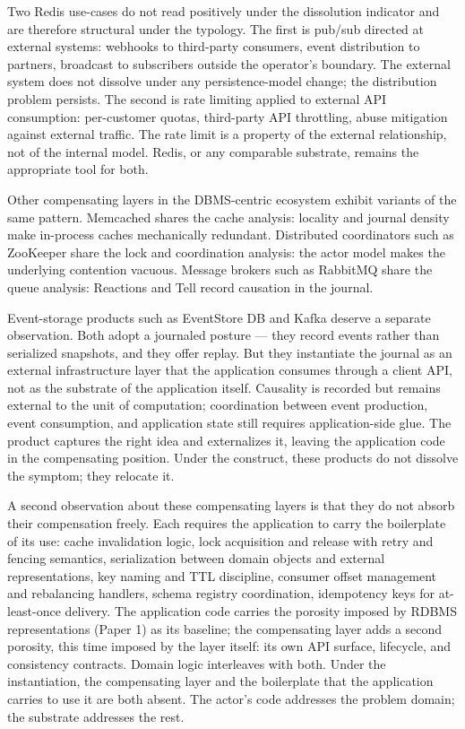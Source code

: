 \documentclass[
]{article}
\begin{document}
Two Redis use-cases do not read positively under the dissolution
indicator and are therefore structural under the typology. The first is
pub/sub directed at external systems: webhooks to third-party consumers,
event distribution to partners, broadcast to subscribers outside the
operator's boundary. The external system does not dissolve under any
persistence-model change; the distribution problem persists. The second
is rate limiting applied to external API consumption: per-customer
quotas, third-party API throttling, abuse mitigation against external
traffic. The rate limit is a property of the external relationship, not
of the internal model. Redis, or any comparable substrate, remains the
appropriate tool for both.

Other compensating layers in the DBMS-centric ecosystem exhibit variants
of the same pattern. Memcached shares the cache analysis: locality and
journal density make in-process caches mechanically redundant.
Distributed coordinators such as ZooKeeper share the lock and
coordination analysis: the actor model makes the underlying contention
vacuous. Message brokers such as RabbitMQ share the queue analysis:
Reactions and Tell record causation in the journal.

Event-storage products such as EventStore DB and Kafka deserve a
separate observation. Both adopt a journaled posture --- they record
events rather than serialized snapshots, and they offer replay. But they
instantiate the journal as an external infrastructure layer that the
application consumes through a client API, not as the substrate of the
application itself. Causality is recorded but remains external to the
unit of computation; coordination between event production, event
consumption, and application state still requires application-side glue.
The product captures the right idea and externalizes it, leaving the
application code in the compensating position. Under the construct,
these products do not dissolve the symptom; they relocate it.

A second observation about these compensating layers is that they do not
absorb their compensation freely. Each requires the application to carry
the boilerplate of its use: cache invalidation logic, lock acquisition
and release with retry and fencing semantics, serialization between
domain objects and external representations, key naming and TTL
discipline, consumer offset management and rebalancing handlers, schema
registry coordination, idempotency keys for at-least-once delivery. The
application code carries the porosity imposed by RDBMS representations
(Paper 1) as its baseline; the compensating layer adds a second
porosity, this time imposed by the layer itself: its own API surface,
lifecycle, and consistency contracts. Domain logic interleaves with
both. Under the instantiation, the compensating layer and the
boilerplate that the application carries to use it are both absent. The
actor's code addresses the problem domain; the substrate addresses the
rest.
\end{document}
